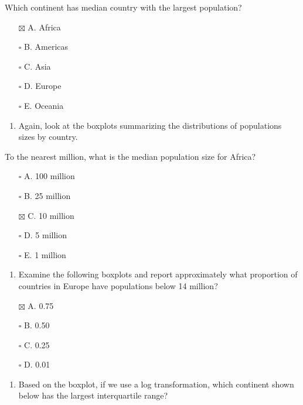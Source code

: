 \documentclass[
]{article}
\providecommand{\tightlist}{%
  \setlength{\itemsep}{0pt}\setlength{\parskip}{0pt}}
\begin{document}
Which continent has median country with the largest population?

\begin{itemize}
\tightlist
\item[$\boxtimes$]
  A. Africa
\item[$\square$]
  B. Americas
\item[$\square$]
  C. Asia
\item[$\square$]
  D. Europe
\item[$\square$]
  E. Oceania
\end{itemize}

\begin{enumerate}
\def\labelenumi{\arabic{enumi}.}
\setcounter{enumi}{4}
\tightlist
\item
  Again, look at the boxplots summarizing the distributions of
  populations sizes by country.
\end{enumerate}

To the nearest million, what is the median population size for Africa?

\begin{itemize}
\tightlist
\item[$\square$]
  A. 100 million
\item[$\square$]
  B. 25 million
\item[$\boxtimes$]
  C. 10 million
\item[$\square$]
  D. 5 million
\item[$\square$]
  E. 1 million
\end{itemize}

\begin{enumerate}
\def\labelenumi{\arabic{enumi}.}
\setcounter{enumi}{5}
\tightlist
\item
  Examine the following boxplots and report approximately what
  proportion of countries in Europe have populations below 14 million?
\end{enumerate}

\begin{itemize}
\tightlist
\item[$\boxtimes$]
  A. 0.75
\item[$\square$]
  B. 0.50
\item[$\square$]
  C. 0.25
\item[$\square$]
  D. 0.01
\end{itemize}

\begin{enumerate}
\def\labelenumi{\arabic{enumi}.}
\setcounter{enumi}{6}
\tightlist
\item
  Based on the boxplot, if we use a log transformation, which continent
  shown below has the largest interquartile range?
\end{enumerate}
\end{document}

